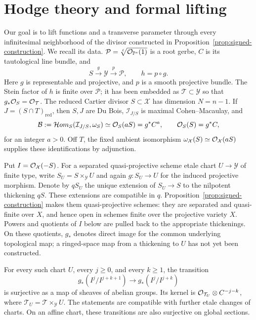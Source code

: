 \section{Hodge theory and formal lifting}\label{sec:hodge}

Our goal is to lift functions and a transverse parameter through
every infinitesimal neighborhood of the divisor constructed in
Proposition~\ref{prop:signed-construction}.  We recall its data.
\(\mathcal P=\sqrt[\ell]{\mathcal{O}_{\mathbb{P}^s}(1)}\) is a root gerbe, \(C\) is
its tautological line bundle, and
\[
 S\xrightarrow{g}\mathcal Y\xrightarrow{p}\mathcal P,
 \qquad h=p\circ g.
\]
Here \(g\) is representable and projective, and \(p\) is a smooth
projective bundle.  The Stein factor of \(h\) is finite over
\(\mathcal P\); it has been embedded as \(\mathcal T\subset\mathcal Y\)
so that \(g_*\mathcal{O}_S=\mathcal{O}_{\mathcal T}\).  The reduced Cartier
divisor \(S\subset\mathcal X\) has dimension \(N=n-1\).  If
\(J=(S\cap T)_{\mathrm{red}}\), then \(S,J\) are Du Bois,
\(\mathcal I_{J/S}\) is maximal Cohen--Macaulay, and
\begin{equation}\label{hg:geometric-lines}
 \mathcal B:=
 \mathcal Hom_S(\mathcal I_{J/S},\omega_S)
 \simeq \mathcal{O}_S(aS)=g^*C^a,
 \qquad
 \mathcal{O}_S(S)=g^*C,
\end{equation}
for an integer \(a>0\).  Off \(T\), the fixed ambient isomorphism
\(\omega_{\mathcal X}(S)\simeq\mathcal{O}_{\mathcal X}(aS)\) supplies these
identifications by adjunction.

Put \(I=\mathcal{O}_{\mathcal X}(-S)\). For a separated quasi-projective
scheme etale chart \(U\to\mathcal Y\) of finite type, write
\(S_U=S\times_{\mathcal Y}U\) and again \(g:S_U\to U\)
for the induced projective morphism. Denote by \(qS_U\) the
unique extension of \(S_U\to S\) to the nilpotent thickening
\(qS\). These extensions are compatible in \(q\).
Proposition~\ref{prop:signed-construction} makes them quasi-projective
schemes: they are separated and quasi-finite over \(X\), and hence
open in schemes finite over the projective variety \(X\).
Powers and quotients of \(I\) below are pulled back to the appropriate
thickenings. On these quotients, \(g_*\) denotes direct image for
the common underlying topological map; a ringed-space map from a
thickening to \(U\) has not yet been constructed.

\begin{proposition}\label{prop:formal-lifting}
For every such chart \(U\), every \(j\geq0\), and every \(k\geq1\),
the transition
\[
 g_*(I^j/I^{j+k+1})
       \longrightarrow g_*(I^j/I^{j+k})
\]
is surjective as a map of sheaves of abelian groups.  Its kernel is
\(\mathcal{O}_{\mathcal T_U}\otimes C^{-j-k}\), where
\(\mathcal T_U=\mathcal T\times_{\mathcal Y}U\).
The statements are compatible with further etale changes of
charts.  On an affine chart, these transitions are also
surjective on global sections.
\end{proposition}

